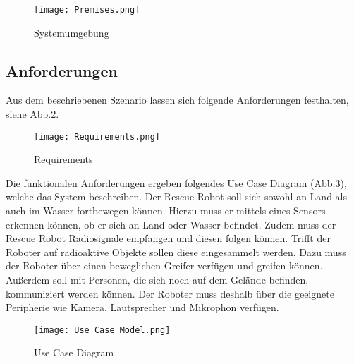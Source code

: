 \begin{figure}[H]
  \centering\texttt{[image: Premises.png]}
  \caption{Systemumgebung}
  \label{Systemumgebung}
\end{figure}

\subsection{Anforderungen}  \label{sec:reqs}
Aus dem beschriebenen Szenario lassen sich folgende Anforderungen festhalten, siehe Abb.\ref{Requirements}.

\begin{figure}[H]
  \centering\texttt{[image: Requirements.png]}
  \caption{Requirements}
  \label{Requirements}
\end{figure}

Die funktionalen Anforderungen ergeben folgendes Use Case Diagram (Abb.\ref{UseCase}), welche das System beschreiben. Der Rescue Robot soll sich sowohl an Land als auch im Wasser fortbewegen können. Hierzu muss er mittels eines Sensors erkennen können, ob er sich an Land oder Wasser befindet. Zudem muss der Rescue Robot Radiosignale empfangen und diesen folgen können. Trifft der Roboter auf radioaktive Objekte sollen diese eingesammelt werden. Dazu muss der Roboter über einen beweglichen Greifer verfügen und greifen können. Außerdem soll mit Personen, die sich noch auf dem Gelände befinden, kommuniziert werden können. Der Roboter muss deshalb über die geeignete Peripherie wie Kamera, Lautsprecher und Mikrophon verfügen.

\begin{figure}[H]
  \centering\texttt{[image: Use Case Model.png]}
  \caption{Use Case Diagram}
  \label{UseCase}
\end{figure}

